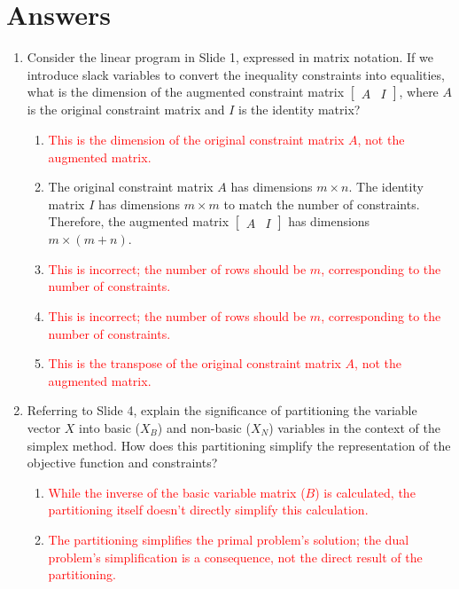 \documentclass{article}%
\newcommand{\incorrect}[1]{\textcolor{red}{#1}}
\begin{document}
\section{Answers}%
\label{sec:Answers}%
\begin{enumerate}%
\item Consider the linear program in Slide 1, expressed in matrix notation.  If we introduce slack variables to convert the inequality constraints into equalities, what is the dimension of the augmented constraint matrix $\begin{bmatrix} A & I \end{bmatrix}$, where $A$ is the original constraint matrix and $I$ is the identity matrix?%
\begin{enumerate}%
\item \incorrect{This is the dimension of the original constraint matrix $A$, not the augmented matrix.}%
\item The original constraint matrix $A$ has dimensions $m \times n$.  The identity matrix $I$ has dimensions $m \times m$ to match the number of constraints.  Therefore, the augmented matrix $\begin{bmatrix} A & I \end{bmatrix}$ has dimensions $m \times (m+n)$.%
\item \incorrect{This is incorrect; the number of rows should be $m$, corresponding to the number of constraints.}%
\item \incorrect{This is incorrect; the number of rows should be $m$, corresponding to the number of constraints.}%
\item \incorrect{This is the transpose of the original constraint matrix $A$, not the augmented matrix.}%
\end{enumerate}%
\vspace{1em}%
\item Referring to Slide 4, explain the significance of partitioning the variable vector $X$ into basic ($X_B$) and non-basic ($X_N$) variables in the context of the simplex method. How does this partitioning simplify the representation of the objective function and constraints?%
\begin{enumerate}%
\item \incorrect{While the inverse of the basic variable matrix ($B$) is calculated, the partitioning itself doesn't directly simplify this calculation.}%
\item \incorrect{The partitioning simplifies the primal problem's solution; the dual problem's simplification is a consequence, not the direct result of the partitioning.}%

\end{enumerate}
\end{enumerate}
\end{document}
